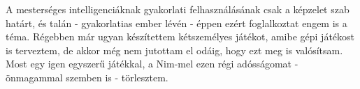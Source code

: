 A mesterséges intelligenciáknak gyakorlati felhasználásának csak a képzelet szab határt, és talán - gyakorlatias ember lévén - éppen ezért foglalkoztat engem is a téma. Régebben már ugyan készítettem kétszemélyes játékot, amibe gépi játékost is terveztem, de akkor még nem jutottam el odáig, hogy ezt meg is valósítsam. Most egy igen egyszerű játékkal, a Nim-mel ezen régi adósságomat - önmagammal szemben is - törlesztem.




